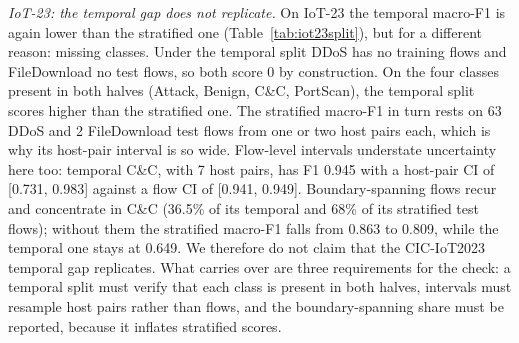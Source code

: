 \emph{IoT-23: the temporal gap does not replicate.} On IoT-23 the temporal macro-F1 is again lower than the stratified one (Table~\ref{tab:iot23split}), but for a different reason: missing classes. Under the temporal split DDoS has no training flows and FileDownload no test flows, so both score 0 by construction. On the four classes present in both halves (Attack, Benign, C\&C, PortScan), the temporal split scores higher than the stratified one. The stratified macro-F1 in turn rests on 63 DDoS and 2 FileDownload test flows from one or two host pairs each, which is why its host-pair interval is so wide. Flow-level intervals understate uncertainty here too: temporal C\&C, with 7 host pairs, has F1 0.945 with a host-pair CI of [0.731, 0.983] against a flow CI of [0.941, 0.949]. Boundary-spanning flows recur and concentrate in C\&C (36.5\% of its temporal and 68\% of its stratified test flows); without them the stratified macro-F1 falls from 0.863 to 0.809, while the temporal one stays at 0.649. We therefore do not claim that the CIC-IoT2023 temporal gap replicates. What carries over are three requirements for the check: a temporal split must verify that each class is present in both halves, intervals must resample host pairs rather than flows, and the boundary-spanning share must be reported, because it inflates stratified scores.
